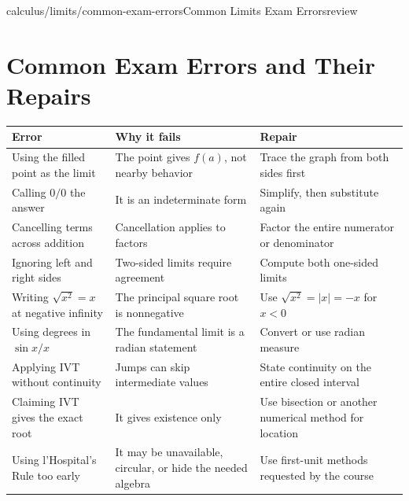\begin{webpage}{calculus/limits/common-exam-errors}{Common Limits Exam Errors}{review}
\section{Common Exam Errors and Their Repairs}

\begin{center}
\begin{longtable}{@{}p{}p{}p{}@{}}
\toprule
\textbf{Error} & \textbf{Why it fails} & \textbf{Repair}\\
\midrule
\endhead
Using the filled point as the limit & The point gives \(f(a)\), not nearby behavior & Trace the graph from both sides first\\
Calling \(0/0\) the answer & It is an indeterminate form & Simplify, then substitute again\\
Cancelling terms across addition & Cancellation applies to factors & Factor the entire numerator or denominator\\
Ignoring left and right sides & Two-sided limits require agreement & Compute both one-sided limits\\
Writing \(\sqrt{x^2}=x\) at negative infinity & The principal square root is nonnegative & Use \(\sqrt{x^2}=|x|=-x\) for \(x<0\)\\
Using degrees in \(\sin x/x\) & The fundamental limit is a radian statement & Convert or use radian measure\\
Applying IVT without continuity & Jumps can skip intermediate values & State continuity on the entire closed interval\\
Claiming IVT gives the exact root & It gives existence only & Use bisection or another numerical method for location\\
Using l'Hospital's Rule too early & It may be unavailable, circular, or hide the needed algebra & Use first-unit methods requested by the course\\
\bottomrule
\end{longtable}
\end{center}
\end{webpage}

